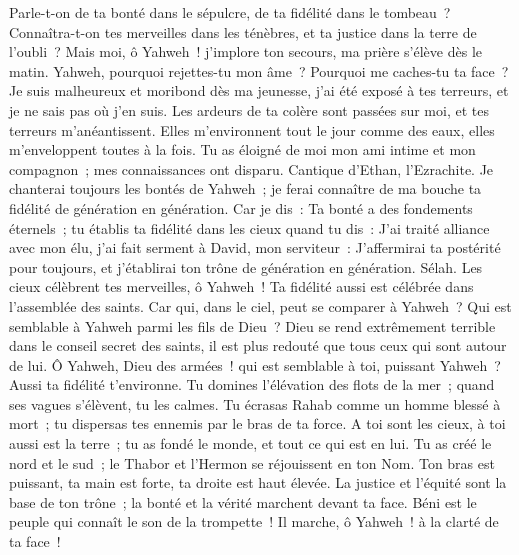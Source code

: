 \begin{multicols}{2}
Parle-t-on de ta bonté dans le sépulcre, de ta fidélité dans le tombeau~?
Connaîtra-t-on tes merveilles dans les ténèbres, et ta justice dans la terre de l'oubli~?
Mais moi, ô Yahweh~! j'implore ton secours, ma prière s'élève dès le matin.
Yahweh, pourquoi rejettes-tu mon âme~? Pourquoi me caches-tu ta face~?
Je suis malheureux et moribond dès ma jeunesse, j'ai été exposé à tes terreurs, et je ne sais pas où j'en suis.
Les ardeurs de ta colère sont passées sur moi, et tes terreurs m'anéantissent.
Elles m'environnent tout le jour comme des eaux, elles m'enveloppent toutes à la fois.
Tu as éloigné de moi mon ami intime et mon compagnon~; mes connaissances ont disparu.
\VerseOne{}Cantique d'Ethan, l'Ezrachite.
Je chanterai toujours les bontés de Yahweh~; je ferai connaître de ma bouche ta fidélité de génération en génération.
Car je dis~: Ta bonté a des fondements éternels~; tu établis ta fidélité dans les cieux quand tu dis~:
J'ai traité alliance avec mon élu, j'ai fait serment à David, mon serviteur~:
J'affermirai ta postérité pour toujours, et j'établirai ton trône de génération en génération. Sélah.
Les cieux célèbrent tes merveilles, ô Yahweh~! Ta fidélité aussi est célébrée dans l'assemblée des saints.
Car qui, dans le ciel, peut se comparer à Yahweh~? Qui est semblable à Yahweh parmi les fils de Dieu~?
Dieu se rend extrêmement terrible dans le conseil secret des saints, il est plus redouté que tous ceux qui sont autour de lui.
Ô Yahweh, Dieu des armées~! qui est semblable à toi, puissant Yahweh~? Aussi ta fidélité t'environne.
Tu domines l'élévation des flots de la mer~; quand ses vagues s'élèvent, tu les calmes.
Tu écrasas Rahab comme un homme blessé à mort~; tu dispersas tes ennemis par le bras de ta force.
A toi sont les cieux, à toi aussi est la terre~; tu as fondé le monde, et tout ce qui est en lui.
Tu as créé le nord et le sud~; le Thabor et l'Hermon se réjouissent en ton Nom.
Ton bras est puissant, ta main est forte, ta droite est haut élevée.
La justice et l'équité sont la base de ton trône~; la bonté et la vérité marchent devant ta face.
Béni est le peuple qui connaît le son de la trompette~! Il marche, ô Yahweh~! à la clarté de ta face~!

\end{multicols}

